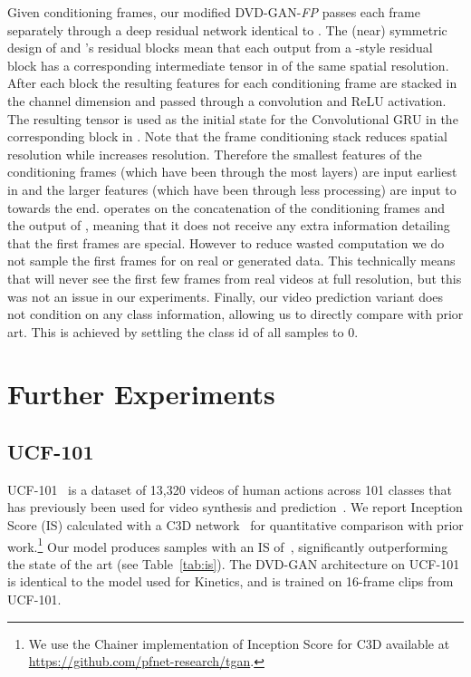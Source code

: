 \documentclass{article} \usepackage{iclr2020_conference,times}
\begin{document}
Given  conditioning frames, our modified DVD-GAN-\textit{FP} passes each frame separately through a deep residual network identical to . The (near) symmetric design of  and 's residual blocks mean that each output from a -style residual block has a corresponding intermediate tensor in  of the same spatial resolution. After each block the resulting features for each conditioning frame are stacked in the channel dimension and passed through a  convolution and ReLU activation. The resulting tensor is used as the initial state for the Convolutional GRU in the corresponding block in . Note that the frame conditioning stack reduces spatial resolution while  increases resolution. Therefore the smallest features of the conditioning frames (which have been through the most layers) are input earliest in  and the larger features (which have been through less processing) are input to  towards the end.  operates on the concatenation of the conditioning frames and the output of , meaning that it does not receive any extra information detailing that the first  frames are special. However to reduce wasted computation we do not sample the first  frames for  on real or generated data. This technically means that  will never see the first few frames from real videos at full resolution, but this was not an issue in our experiments. Finally, our video prediction variant does not condition on any class information, allowing us to directly compare with prior art. This is achieved by settling the class id of all samples to 0.

\section{Further Experiments}

\subsection{UCF-101}
\label{ss:ucf}


UCF-101~\citep{soomro2012ucf101} is a dataset of 13,320 videos of human actions across 101 classes that has previously been used for video synthesis and prediction~\citep{saito2017temporal, saito2018tganv2, tulyakov2018mocogan}. We report Inception Score (IS) calculated with a C3D network~\citep{tran2015learning} for quantitative comparison with prior work.\footnote{We use the Chainer \citep{tokui2015chainer} implementation of Inception Score for C3D available at  \href{https://github.com/pfnet-research/tgan}{https://github.com/pfnet-research/tgan}.}
Our model produces samples with an IS of~, significantly outperforming the state of the art (see Table~\ref{tab:is}). The DVD-GAN architecture on UCF-101 is identical to the model used for Kinetics, and is trained on 16-frame  clips from UCF-101.
\end{document}
